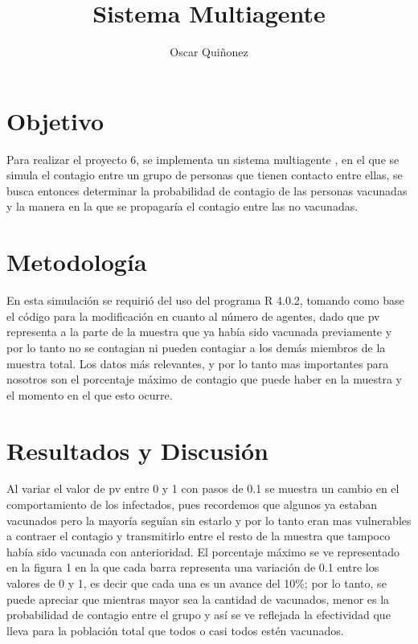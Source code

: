\documentclass{article}
\title {Sistema Multiagente}
\author{Oscar Qui\~nonez}
\begin{document}
\maketitle
 
\section{Objetivo}\label{met}

Para realizar el proyecto 6, se implementa un sistema multiagente \cite{satuelisa}, en el que se simula el contagio entre un grupo de personas que tienen contacto entre ellas, se busca entonces determinar la probabilidad de contagio de las personas vacunadas y la manera en la que se propagar\'ia el contagio entre las no vacunadas.

\section{Metodolog\'ia}\label{met}

En esta simulaci\'on se requiri\'o del uso del programa R 4.0.2, tomando como base el c\'odigo \cite{satu} para la modificaci\'on en cuanto al n\'umero de agentes, dado que pv representa a la parte de la muestra que ya hab\'ia sido vacunada previamente y por lo tanto no se contagian ni pueden contagiar a los dem\'as miembros de la muestra total. Los datos m\'as relevantes, y por lo tanto mas importantes para nosotros son el porcentaje m\'aximo de contagio que puede haber en la muestra y el momento en el que esto ocurre.

\section{Resultados y Discusi\'on}\label{res}

Al variar el valor de pv entre 0 y 1 con pasos de 0.1 se muestra un cambio en el comportamiento de los infectados, pues recordemos que algunos ya estaban vacunados pero la mayor\'ia segu\'ian sin estarlo y por lo tanto eran mas vulnerables a contraer el contagio y transmitirlo entre el resto de la muestra que tampoco hab\'ia sido vacunada con anterioridad. El porcentaje m\'aximo se ve representado en la figura 1 en la que cada barra representa una variaci\'on de 0.1 entre los valores de 0 y 1, es decir que cada una es un avance del 10\%; por lo tanto, se puede apreciar que mientras mayor sea la cantidad de vacunados, menor es la probabilidad de contagio entre el grupo y as\'i se ve reflejada la efectividad que lleva para la poblaci\'on total que todos o casi todos est\'en vacunados.
\end{document}
